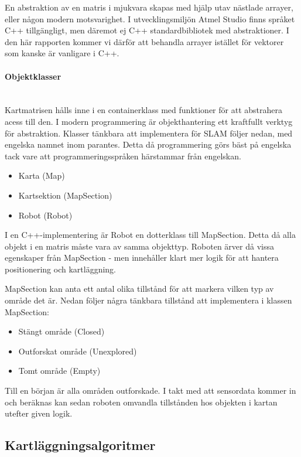 \documentclass[a4paper,12pt,fleqn]{article}
\begin{document}
En abstraktion av en matris i mjukvara skapas med hjälp utav nästlade arrayer, eller någon modern motsvarighet. I utvecklingsmiljön Atmel Studio finns språket C++ tillgängligt, men däremot ej C++ standardbibliotek med abstraktioner. I den här rapporten kommer vi därför att behandla arrayer istället för vektorer som kanske är vanligare i C++. 

\paragraph{Objektklasser}
~\\
Kartmatrisen hålls inne i en containerklass med funktioner för att abstrahera acess till den. I modern programmering är objekthantering ett kraftfullt verktyg för abstraktion. Klasser tänkbara att implementera för SLAM följer nedan, med engelska namnet inom parantes. Detta då programmering görs bäst på engelska tack vare att programmeringsspråken härstammar från engelskan. 

\begin{itemize}
	\item Karta (Map)
	\item Kartsektion (MapSection)
	\item Robot (Robot)
\end{itemize}

I en C++-implementering är Robot en dotterklass till MapSection. Detta då alla objekt i en matris måste vara av samma objekttyp. Roboten ärver då vissa egenskaper från MapSection - men innehåller klart mer logik för att hantera positionering och kartläggning. 

MapSection kan anta ett antal olika tillstånd för att markera vilken typ av område det är. Nedan följer några tänkbara tillstånd att implementera i klassen MapSection: 

\begin{itemize}
	\item Stängt område (Closed)
	\item Outforskat område (Unexplored)
	\item Tomt område (Empty)
\end{itemize}

Till en början är alla områden outforskade. I takt med att sensordata kommer in och beräknas kan sedan roboten omvandla tillstånden hos objekten i kartan utefter given logik. 


\newpage
\subsection{Kartläggningsalgoritmer}
\end{document}
